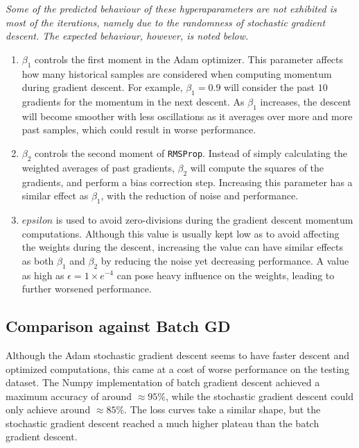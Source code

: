 \documentclass[letter]{article}
\begin{document}
\textit{Some of the predicted behaviour of these hyperaparameters are not exhibited is most of the iterations, namely due to the randomness of stochastic gradient descent. The expected behaviour, however, is noted below.}

\begin{enumerate}[label=(\alph*)]
	\item $\beta_1$ controls the first moment in the Adam optimizer. This parameter affects how many historical samples are considered when computing momentum during gradient descent. For example, $\beta_1 = 0.9$ will consider the past $10$ gradients for the momentum in the next descent. As $\beta_1$ increases, the descent will become smoother with less oscillations as it averages over more and more past samples, which could result in worse performance.
	\item $\beta_2$ controls the second moment of \texttt{RMSProp}. Instead of simply calculating the weighted averages of past gradients, $\beta_2$ will compute the squares of the gradients, and perform a bias correction step. Increasing this parameter has a similar effect as $\beta_1$, with the reduction of noise and performance.
	\item $epsilon$ is used to avoid zero-divisions during the gradient descent momentum computations. Although this value is usually kept low as to avoid affecting the weights during the descent, increasing the value can have similar effects as both $\beta_1$ and $\beta_2$ by reducing the noise yet decreasing performance. A value as high as $\epsilon = 1 \times e^{-4}$ can pose heavy influence on the weights, leading to further worsened performance.
\end{enumerate}

\subsection{Comparison against Batch GD}
Although the Adam stochastic gradient descent seems to have faster descent and optimized computations, this came at a cost of worse performance on the testing dataset. The Numpy implementation of batch gradient descent achieved a maximum accuracy of around $\approx 95\%$, while the stochastic gradient descent could only achieve around $\approx 85\%$. The loss curves take a similar shape, but the stochastic gradient descent reached a much higher plateau than the batch gradient descent. 
\end{document}
